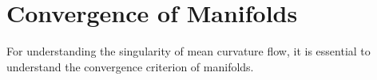 \chapter{Convergence of Manifolds}


For understanding the singularity of mean curvature flow, it is essential to understand the convergence criterion of manifolds. 